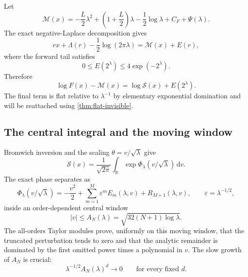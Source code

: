 \documentclass[11pt,oneside]{article}
\theoremstyle{definition}
\theoremstyle{remark}
\newcommand{\R}{\mathbb R}
\newcommand{\dd}{\,\mathrm d}
\begin{document}
Let
\begin{equation}
 \mathcal M(x)=
 -\frac L2\lambda^2+
 \left(1+\frac L2\right)\lambda-\frac12\log\lambda
 +C_F+\Psi(\lambda).
 \label{eq:sharp-main-supp}
\end{equation}
The exact negative-Laplace decomposition gives
\begin{equation}
 rx+\Lambda(r)-\frac12\log(2\pi\lambda)
 =\mathcal M(x)+E(r),
 \label{eq:exact-main-tail-supp}
\end{equation}
where the forward tail satisfies
\begin{equation}
 0\le E(2^\lambda)\le4\exp(-2^\lambda).
 \label{eq:forward-tail-flat-supp}
\end{equation}
Therefore
\begin{equation}
 \log F(x)-\mathcal M(x)=\log\mathcal S(x)+E(2^\lambda).
 \label{eq:exact-error-separation-supp}
\end{equation}
The final term is flat relative to $\lambda^{-1}$ by elementary exponential domination and
will be reattached using \cref{thm:flat-invisible}.

\subsection{The central integral and the moving window}

Bromwich inversion and the scaling $\theta=v/\sqrt\lambda$ give
\begin{equation}
 \mathcal S(x)=\frac1{\sqrt{2\pi}}
 \int_{\R}\exp\Phi_\lambda(v/\sqrt\lambda)\dd v.
 \label{eq:normalized-saddle-integral}
\end{equation}
The exact phase separates as
\begin{equation}
 \Phi_\lambda(v/\sqrt\lambda)
 =-\frac{v^2}{2}+
 \sum_{m=1}^{M}\varepsilon^mE_m(\lambda,v)
 +R_{M+1}(\lambda,v),
 \qquad
 \varepsilon=\lambda^{-1/2},
 \label{eq:central-exponent-expansion}
\end{equation}
inside an order-dependent central window
\begin{equation}
 |v|\le A_N(\lambda)=\sqrt{32(N+1)\log\lambda}.
 \label{eq:central-window-lambda}
\end{equation}
The all-orders Taylor modules prove, uniformly on this moving window, that the truncated
perturbation tends to zero and that the analytic remainder is dominated by the first omitted
power times a polynomial in $v$.  The slow growth of $A_N$ is crucial:
\begin{equation}
 \lambda^{-1/2}A_N(\lambda)^d\longrightarrow0
 \qquad\text{for every fixed }d.
 \label{eq:epsilon-log-radius-decay}
\end{equation}
\end{document}
